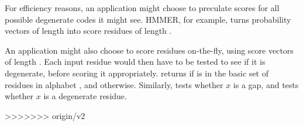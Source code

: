For efficiency reasons, an application might choose to preculate
scores for all possible degenerate codes it might see. HMMER, for
example, turns probability vectors of length  into score
residues of length .

An application might also choose to score residues on-the-fly, using
score vectors of length . Each input residue  would
then have to be tested to see if it is degenerate, before scoring it
appropriately.   returns 
if  is in the basic set of  residues in alphabet
, and  otherwise. Similarly,
 tests whether $x$ is a gap, and
 tests whether $x$ is a degenerate
residue.

>>>>>>> origin/v2
